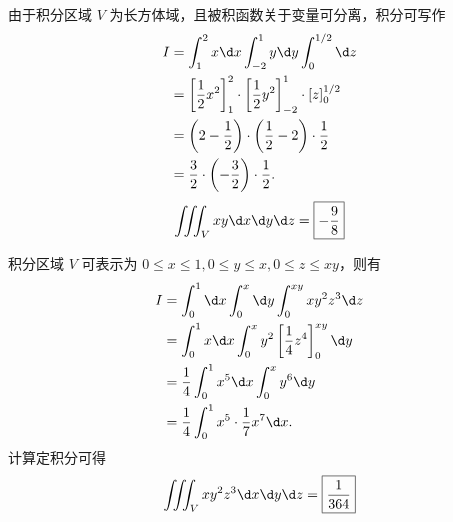 \begin{solution}
    由于积分区域 $V$ 为长方体域，且被积函数关于变量可分离，积分可写作
    \begin{equation}
        \begin{aligned}
            I & = \int_1^2 x \d x \int_{-2}^1 y \d y \int_0^{1/2} \d z                                                        \\
              & = \left[ \frac{1}{2}x^2 \right]_1^2 \cdot \left[ \frac{1}{2}y^2 \right]_{-2}^1 \cdot \left[ z \right]_0^{1/2} \\
              & = \left( 2 - \frac{1}{2} \right) \cdot \left( \frac{1}{2} - 2 \right) \cdot \frac{1}{2}                       \\
              & = \frac{3}{2} \cdot \left( -\frac{3}{2} \right) \cdot \frac{1}{2}.
        \end{aligned}
    \end{equation}
    \begin{equation}
        \iiint_V xy \d x \d y \d z = \boxed{-\frac{9}{8}}
    \end{equation}

    积分区域 $V$ 可表示为 $0 \le x \le 1, 0 \le y \le x, 0 \le z \le xy$，则有
    \begin{equation}
        \begin{aligned}
            I & = \int_0^1 \d x \int_0^x \d y \int_0^{xy} xy^2 z^3 \d z                   \\
              & = \int_0^1 x \d x \int_0^x y^2 \left[ \frac{1}{4} z^4 \right]_0^{xy} \d y \\
              & = \frac{1}{4} \int_0^1 x^5 \d x \int_0^x y^6 \d y                         \\
              & = \frac{1}{4} \int_0^1 x^5 \cdot \frac{1}{7} x^7 \d x.
        \end{aligned}
    \end{equation}
    计算定积分可得
    \begin{equation}
        \iiint_V xy^2 z^3 \d x \d y \d z = \boxed{\frac{1}{364}}
    \end{equation}


\end{solution}
